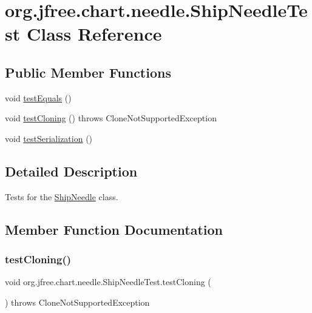 \hypertarget{classorg_1_1jfree_1_1chart_1_1needle_1_1_ship_needle_test}{}\section{org.\+jfree.\+chart.\+needle.\+Ship\+Needle\+Test Class Reference}
\label{classorg_1_1jfree_1_1chart_1_1needle_1_1_ship_needle_test}
\subsection*{Public Member Functions}
\begin{DoxyCompactItemize}
\item 
void \mbox{\hyperlink{classorg_1_1jfree_1_1chart_1_1needle_1_1_ship_needle_test_a7e0c433f564964b5f0995c8d73dfe2a0}{test\+Equals}} ()
\item 
void \mbox{\hyperlink{classorg_1_1jfree_1_1chart_1_1needle_1_1_ship_needle_test_a4d673198c2741f147a665ca6c9106eb9}{test\+Cloning}} ()  throws Clone\+Not\+Supported\+Exception 
\item 
void \mbox{\hyperlink{classorg_1_1jfree_1_1chart_1_1needle_1_1_ship_needle_test_a76acb5836e95e6b4ade541ee89f83a98}{test\+Serialization}} ()
\end{DoxyCompactItemize}


\subsection{Detailed Description}
Tests for the \mbox{\hyperlink{classorg_1_1jfree_1_1chart_1_1needle_1_1_ship_needle}{Ship\+Needle}} class. 

\subsection{Member Function Documentation}
\mbox{\label{classorg_1_1jfree_1_1chart_1_1needle_1_1_ship_needle_test_a4d673198c2741f147a665ca6c9106eb9}} 
\subsubsection{\texorpdfstring{test\+Cloning()}{testCloning()}}
{\footnotesize\ttfamily void org.\+jfree.\+chart.\+needle.\+Ship\+Needle\+Test.\+test\+Cloning (\begin{DoxyParamCaption}{ }\end{DoxyParamCaption}) throws Clone\+Not\+Supported\+Exception}

